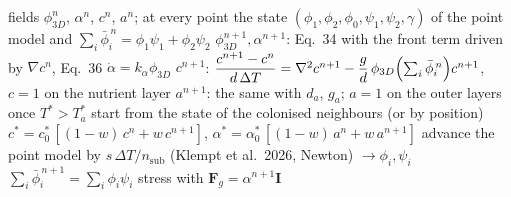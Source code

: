 \begin{algorithm}[htbp]
\caption{One outer increment $T^*_n\to T^*_{n+1}$ of the coupling}
\label{alg:ch5-coupling}
\begin{algorithmic}[1]
\REQUIRE fields $\phi_{3D}^n$, $\alpha^n$, $c^n$, $a^n$; at every point the state
  $(\phi_1,\phi_2,\phi_0,\psi_1,\psi_2,\gamma)$ of the point model and $\sum_i\bar\phi_i^{\,n}=\phi_1\psi_1+\phi_2\psi_2$
\STATE $\phi_{3D}^{n+1},\alpha^{n+1}$: Eq.~34 with the front term driven by $\nabla c^n$, Eq.~36
  $\dot\alpha=k_\alpha\phi_{3D}$
\STATE $c^{n+1}$: $\dfrac{c^{n+1}-c^n}{d\,\Delta T}=\nabla^2c^{n+1}-\dfrac{g}{d}\,\phi_{3D}\Bigl(\sum_i\bar\phi_i^{\,n}\Bigr)c^{n+1}$,
  $c=1$ on the nutrient layer
\STATE $a^{n+1}$: the same with $d_a$, $g_a$; $a=1$ on the outer layers once $T^*>T^*_a$
    \STATE start from the state of the colonised neighbours (or by position)
  \ENDIF
    \STATE $c^*=c^*_0\,[(1-w)\,c^n+w\,c^{n+1}]$, \quad $\alpha^*=\alpha^*_0\,[(1-w)\,a^n+w\,a^{n+1}]$
    \STATE advance the point model by $s\,\Delta T/n_{\mathrm{sub}}$ (Klempt et al.\ 2026, Newton) $\to\phi_i,\psi_i$
  \ENDFOR
  \STATE $\sum_i\bar\phi_i^{\,n+1}=\sum_i\phi_i\psi_i$
\ENDFOR
\STATE stress with $\mathbf F_g=\alpha^{n+1}\mathbf I$
\end{algorithmic}
\end{algorithm}
